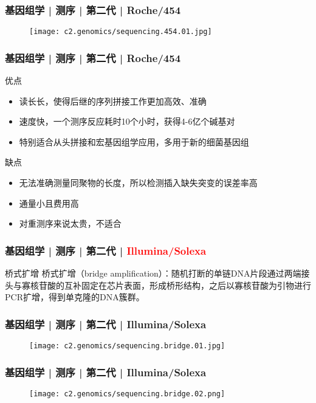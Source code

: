 \begin{frame}
  \frametitle{基因组学 | 测序 | 第二代 | Roche/454}
  \begin{figure}
    \centering
    \texttt{[image: c2.genomics/sequencing.454.01.jpg]}
  \end{figure}
\end{frame}

\begin{frame}
  \frametitle{基因组学 | 测序 | 第二代 | Roche/454}
  \begin{block}{优点}
    \begin{itemize}
      \item 读长长，使得后继的序列拼接工作更加高效、准确
      \item 速度快，一个测序反应耗时10个小时，获得4-6亿个碱基对
      \item 特别适合从头拼接和宏基因组学应用，多用于新的细菌基因组
    \end{itemize}
  \end{block}
  \pause
  \begin{block}{缺点}
    \begin{itemize}
      \item 无法准确测量同聚物的长度，所以检测插入缺失突变的误差率高
      \item 通量小且费用高
      \item 对重测序来说太贵，不适合
    \end{itemize}
  \end{block}
\end{frame}

\begin{frame}
  \frametitle{基因组学 | 测序 | 第二代 | \textcolor{red}{Illumina/Solexa}}
  \begin{block}{桥式扩增}
桥式扩增（bridge amplification）：随机打断的单链DNA片段通过两端接头与寡核苷酸的互补固定在芯片表面，形成桥形结构，之后以寡核苷酸为引物进行PCR扩增，得到单克隆的DNA簇群。
  \end{block}
\end{frame}

\begin{frame}
  \frametitle{基因组学 | 测序 | 第二代 | Illumina/Solexa}
  \begin{figure}
    \centering
    \texttt{[image: c2.genomics/sequencing.bridge.01.jpg]}
  \end{figure}
\end{frame}

\begin{frame}
  \frametitle{基因组学 | 测序 | 第二代 | Illumina/Solexa}
  \begin{figure}
    \centering
    \texttt{[image: c2.genomics/sequencing.bridge.02.png]}
  \end{figure}
\end{frame}

